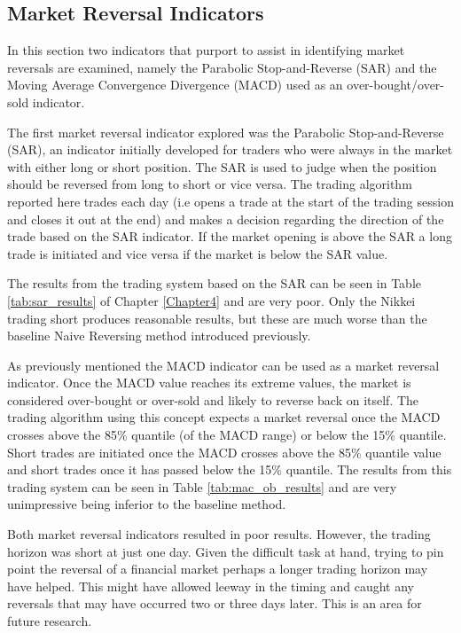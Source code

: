 \subsection{Market Reversal Indicators}
In this section two indicators that purport to assist in identifying market reversals are examined, namely the Parabolic Stop-and-Reverse (SAR) and the Moving Average Convergence Divergence (MACD) used as an over-bought/over-sold indicator. 

The first market reversal indicator explored was the Parabolic Stop-and-Reverse (SAR), an indicator initially developed for traders who were always in the market with either long or short position. The SAR is used to judge when the  position should be reversed from long to short or vice versa. The trading algorithm reported here trades each day (i.e opens a trade at the start of the trading session and closes it out at the end) and makes a decision regarding the direction of the trade based on the SAR indicator. If the market opening is above the SAR a long trade is initiated and vice versa if the market is below the SAR value.

The results from the trading system based on the SAR can be seen in Table \ref{tab:sar_results} of Chapter \ref{Chapter4} and are very poor. Only the Nikkei trading short produces reasonable results, but these are much worse than the baseline Naive Reversing method introduced previously.

As previously mentioned the MACD indicator can be used as a market reversal indicator. Once the MACD value reaches its extreme values, the market is considered over-bought or over-sold and likely to reverse back on itself. The trading algorithm using this concept expects a market reversal once the MACD crosses above the 85\% quantile (of the MACD range) or below the 15\% quantile. Short trades are initiated once the MACD crosses above the 85\% quantile value and short trades once it has passed below the 15\% quantile. The results from this trading system can be seen in Table \ref{tab:mac_ob_results} and are very unimpressive being inferior to the baseline method.

Both market reversal indicators resulted in poor results. However, the trading horizon was short at just one day. Given the difficult task at hand, trying to pin point the reversal of a financial market perhaps a longer trading horizon may have helped. This might have allowed leeway in the timing and caught any reversals that may have occurred two or three days later. This is an area for future research.  

